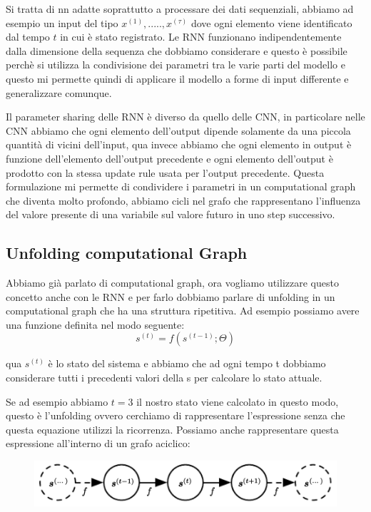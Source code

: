 \documentclass[14pt]{extreport}
\begin{document}
Si tratta di nn adatte soprattutto a processare dei dati sequenziali, abbiamo ad esempio un input del tipo $x^{(1)},.....,x^{(\tau)}$ dove ogni
elemento viene identificato dal tempo $t$ in cui è stato registrato. Le RNN funzionano indipendentemente dalla dimensione della sequenza che dobbiamo
considerare e questo è possibile perchè si utilizza la condivisione dei parametri tra le varie parti del modello e questo mi permette quindi di
applicare il modello a forme di input differente e generalizzare comunque.

Il parameter sharing delle RNN è diverso da quello delle CNN, in particolare nelle CNN abbiamo che ogni elemento dell'output dipende solamente da una
piccola quantità di vicini dell'input, qua invece abbiamo che ogni elemento in output è funzione dell'elemento dell'output precedente e ogni elemento
dell'output è prodotto con la stessa update rule usata per l'output precedente. Questa formulazione mi permette di condividere i parametri in un
computational graph che diventa molto profondo, abbiamo cicli nel grafo che rappresentano l'influenza del valore presente di una variabile sul valore
futuro in uno step successivo.

\subsection{Unfolding computational Graph}

Abbiamo già parlato di computational graph, ora vogliamo utilizzare questo concetto anche con le RNN e per farlo dobbiamo parlare di unfolding in un
computational graph che ha una struttura ripetitiva. Ad esempio possiamo avere una funzione definita nel modo seguente:
$$s^{(t)} = f(s^{(t-1)}; \Theta)$$

qua $s^{(t)}$ è lo stato del sistema e abbiamo che ad ogni tempo t dobbiamo considerare tutti i precedenti valori della s per calcolare lo stato
attuale.

Se ad esempio abbiamo $t=3$ il nostro stato viene calcolato in questo modo, questo è l'unfolding ovvero cerchiamo di rappresentare l'espressione senza
che questa equazione utilizzi la ricorrenza. Possiamo anche rappresentare questa espressione all'interno di un grafo aciclico:

\begin{figure}[H]
	\centering
	\includegraphics[width=0.7\linewidth]{414.jpeg}
\end{figure}
\end{document}
